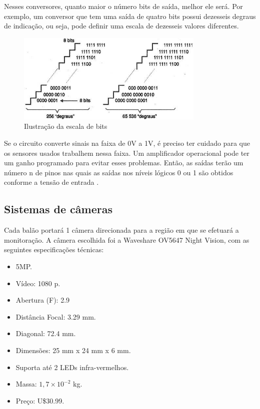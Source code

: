 Nesses conversores, quanto maior o número bits de saída, melhor ele será. Por exemplo, um conversor que tem uma saída de quatro bits possui dezesseis degraus de indicação, ou seja, pode definir uma escala de dezesseis valores diferentes.

\begin{figure}[H]
  \centering
  \includegraphics[width=0.8\textwidth]{figuras/ADC}
  \caption[Ilustração da escala de bits]{Ilustração da escala de bits~\cite{conversoresad}}
  \label{img:escaladebits}
\end{figure}

Se o circuito converte sinais na faixa de 0V a 1V, é preciso ter cuidado para que os sensores usados trabalhem nessa faixa. Um amplificador operacional pode ter um ganho programado para evitar esses problemas. Então, as saídas terão um número n de pinos nas quais as saídas nos níveis lógicos 0 ou 1 são obtidos conforme a tensão de entrada \cite{conversoresad}.

\subsection{Sistemas de câmeras}

Cada balão portará 1 câmera direcionada para a região em que se efetuará a monitoração. A câmera escolhida foi a Waveshare OV5647 Night Vision, com as seguintes especificações técnicas:

\begin{itemize}
	\item 5MP.
	\item Vídeo: 1080 p.
	\item Abertura (F): 2.9
	\item Distância Focal: 3.29 mm.
	\item Diagonal: 72.4 mm.
	\item Dimensões: 25 mm x 24 mm x 6 mm.
	\item Suporta até 2 LEDs infra-vermelhos.
	\item Massa: $1,7\times 10^{-2}$ kg.
	\item Preço: U\$30.99.
\end{itemize}

